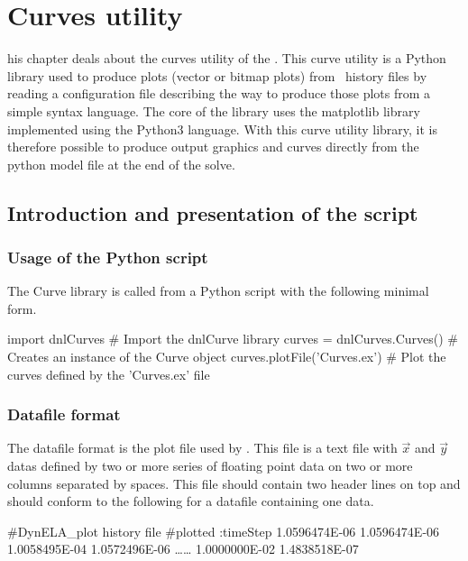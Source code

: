 
\chapter{Curves utility}

\startcontents[chapters]
\printmyminitoc[1]

his chapter deals about the curves utility of the \DynELA. This curve utility is a Python library used to produce plots (vector or bitmap plots) from \DynELA~history files by reading a configuration file describing the way to produce those plots from a simple syntax language. The core of the library uses the matplotlib library implemented using the Python3 language. With this curve utility library, it is therefore possible to produce output graphics and curves directly from the python model file at the end of the solve.

\section{Introduction and presentation of the script}

\subsection{Usage of the Python script}

The Curve library is called from a Python script with the following minimal form.

\begin{PythonListing}
import dnlCurves              # Import the dnlCurve library
curves = dnlCurves.Curves()   # Creates an instance of the Curve object
curves.plotFile('Curves.ex')  # Plot the curves defined by the 'Curves.ex' file
\end{PythonListing}

\subsection{Datafile format}

The datafile format is the plot file used by \DynELA. This file is a text file with $\overrightarrow{x}$ and $\overrightarrow{y}$ datas defined by two or more series of floating point data on two or more columns separated by spaces. This file should contain two header lines on top and should conform to the following for a datafile containing one data.

\begin{PythonListing}
#DynELA_plot history file
#plotted :timeStep 
1.0596474E-06 1.0596474E-06 
1.0058495E-04 1.0572496E-06 
\ldots\ldots
1.0000000E-02 1.4838518E-07 
\end{PythonListing}

